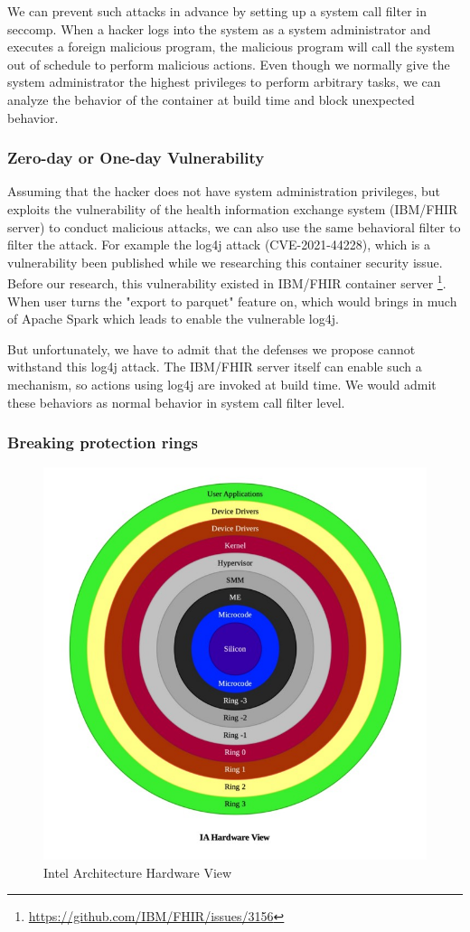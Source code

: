 We can prevent such attacks in advance by setting up a system call filter
in seccomp. When a hacker logs into the system as a system administrator
and executes a foreign malicious program, the malicious program will call
the system out of schedule to perform malicious actions.
Even though we normally give the system administrator the highest privileges
to perform arbitrary tasks, we can analyze the behavior of the container
at build time and block unexpected behavior.

\subsubsection{Zero-day or One-day Vulnerability}
Assuming that the hacker does not have system administration privileges,
but exploits the vulnerability of the health information exchange system
(IBM/FHIR server) to conduct malicious attacks, we can also use the same
behavioral filter to filter the attack.
For example the log4j attack (CVE-2021-44228), which is a vulnerability
been published while we researching this container security issue.
Before our research, this vulnerability existed in IBM/FHIR container server
\footnote{\url{https://github.com/IBM/FHIR/issues/3156}}.
When user turns the "export to parquet" feature on, which would
brings in much of Apache Spark which leads to enable the vulnerable log4j.

But unfortunately, we have to admit that the defenses we propose cannot
withstand this log4j attack. The IBM/FHIR server itself can enable such a mechanism,
so actions using log4j are invoked at build time. We would admit these
behaviors as normal behavior in system call filter level.

\subsubsection{Breaking protection rings}

\begin{figure}
    \centering
    \includegraphics[width=.5\textwidth]{src/ring.jpeg}
    \caption{Intel Architecture Hardware View}
    \label{ring}
\end{figure}

